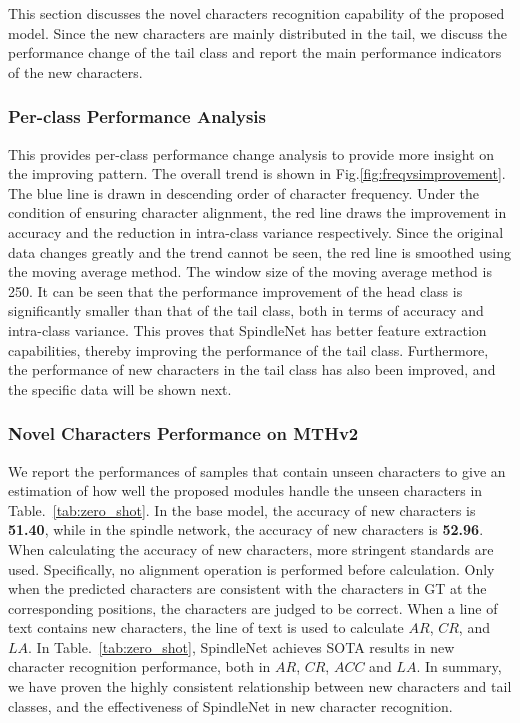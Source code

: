 This section discusses the novel characters recognition capability of the proposed model. Since the new characters are mainly distributed in the tail, we discuss the performance change of the tail class and report the main performance indicators of the new characters.
\subsubsection{Per-class Performance Analysis}

This provides per-class performance change analysis to provide more insight on the improving pattern. 
The overall trend is shown in Fig.\ref{fig:freqvsimprovement}.
The blue line is drawn in descending order of character frequency. Under the condition of ensuring character alignment, the red line draws the improvement in accuracy and the reduction in intra-class variance respectively. Since the original data changes greatly and the trend cannot be seen, the red line is smoothed using the moving average method. The window size of the moving average method is 250. It can be seen that the performance improvement of the head class is significantly smaller than that of the tail class, both in terms of accuracy and intra-class variance. This proves that SpindleNet has better feature extraction capabilities, thereby improving the performance of the tail class. Furthermore, the performance of new characters in the tail class has also been improved, and the specific data will be shown next.



\subsubsection{Novel Characters Performance on MTHv2}

We report the performances of samples that contain unseen characters to give an estimation of how well the proposed modules handle the unseen characters in Table.~\ref{tab:zero_shot}. In the base model, the accuracy of new characters is \textbf{51.40}, while in the spindle network, the accuracy of new characters is \textbf{52.96}. When calculating the accuracy of new characters, more stringent standards are used. Specifically, no alignment operation is performed before calculation. Only when the predicted characters are consistent with the characters in GT at the corresponding positions, the characters are judged to be correct.
When a line of text contains new characters, the line of text is used to calculate $AR$, $CR$, and $LA$.
In Table.~\ref{tab:zero_shot}, SpindleNet achieves SOTA results in new character recognition performance, both in $AR$, $CR$, $ACC$ and $LA$. In summary, we have proven the highly consistent relationship between new characters and tail classes, and the effectiveness of SpindleNet in new character recognition.

